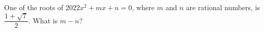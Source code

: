 One of the roots of $2022x^2+mx+n=0$, where $m$ and $n$ are rational numbers, is $\dfrac{1+\sqrt7}{2}$. What is $m-n$?
